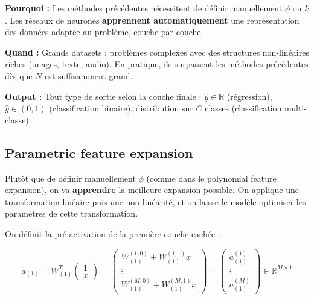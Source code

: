 \documentclass[11pt,a4paper,openany]{book}
\begin{document}
\begin{rembox}[title=Pourquoi et quand utiliser les réseaux de neurones ?]
\textbf{Pourquoi :} Les méthodes précédentes nécessitent de définir manuellement $\phi$ ou $k$. Les réseaux de neurones \textbf{apprennent automatiquement} une représentation des données adaptée au problème, couche par couche.

\vspace{0.3cm}

\textbf{Quand :} Grands datasets ; problèmes complexes avec des structures non-linéaires riches (images, texte, audio). En pratique, ils surpassent les méthodes précédentes dès que $N$ est suffisamment grand.

\vspace{0.3cm}

\textbf{Output :} Tout type de sortie selon la couche finale : $\hat{y} \in \mathbb{R}$ (régression), $\hat{y} \in (0,1)$ (classification binaire), distribution sur $C$ classes (classification multi-classe).
\end{rembox}

\vspace{0.6cm}

\subsection{Parametric feature expansion}

Plutôt que de définir manuellement $\phi$ (comme dans le polynomial feature expansion), on va \textbf{apprendre} la meilleure expansion possible. On applique une transformation linéaire puis une non-linéarité, et on laisse le modèle optimiser les paramètres de cette transformation.

\medskip

On définit la pré-activation de la première couche cachée :

\[
a_{(1)}
= W_{(1)}^T
\begin{pmatrix} 1 \\ x \end{pmatrix}
= \begin{pmatrix}
W_{(1)}^{(1,0)} + W_{(1)}^{(1,1)} x \\
\vdots \\
W_{(1)}^{(M,0)} + W_{(1)}^{(M,1)} x
\end{pmatrix}
= \begin{pmatrix}
a_{(1)}^{(1)} \\
\vdots \\
a_{(1)}^{(M)}
\end{pmatrix}
\in \mathbb{R}^{M \times 1}
\]
\end{document}
